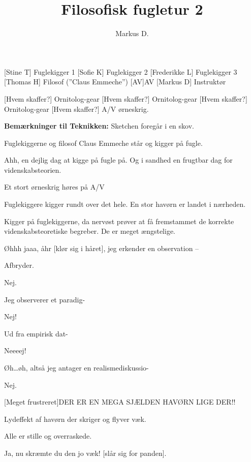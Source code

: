\documentclass[a4paper,12pt]{article}
\title{Filosofisk fugletur 2}
\author{Markus D.}
\begin{document}
\maketitle




\begin{roles}
	[Stine T] Fuglekigger 1
	[Sofie K] Fuglekigger 2
	[Frederikke L] Fuglekigger 3
	[Thomas H] Filosof (''Claus Emmeche'')
	[AV]AV
		[Markus D] Instruktør
\end{roles}


\begin{props}
	[Hvem skaffer?] Ornitolog-gear
	[Hvem skaffer?] Ornitolog-gear
	[Hvem skaffer?] Ornitolog-gear
	[Hvem skaffer?] A/V ørneskrig.
\end{props}

\begin{sketch}



\scene \textbf{Bemærkninger til Teknikken:} Sketchen foregår i en skov.





\scene Fuglekiggerne og filosof Claus Emmeche står og kigger på fugle. 

Ahh, en dejlig dag at kigge på fugle på. Og i sandhed en frugtbar dag for videnskabsteorien.

Et stort ørneskrig høres på A/V

\scene Fuglekiggere kigger rundt over det hele. En stor havørn er landet i nærheden.

Kigger på fuglekiggerne, da nervøst prøver at få fremstammet de korrekte videnskabsteoretiske begreber. De er meget ængstelige.

Øhhh jaaa, åhr [klør sig i håret], jeg erkender en observation -- 

Afbryder.

Nej.

Jeg observerer et paradig-

Nej!

Ud fra empirisk dat-

Neeeej!


Øh\ldots øh, altså jeg antager en realismediskussio-

Nej.

[Meget frustreret]DER ER EN MEGA SJÆLDEN HAVØRN LIGE DER!!

Lydeffekt af havørn der skriger og flyver væk.

\scene Alle er stille og overraskede.

Ja, nu skræmte du den jo væk! [slår sig for panden].



\end{sketch}
\end{document}
